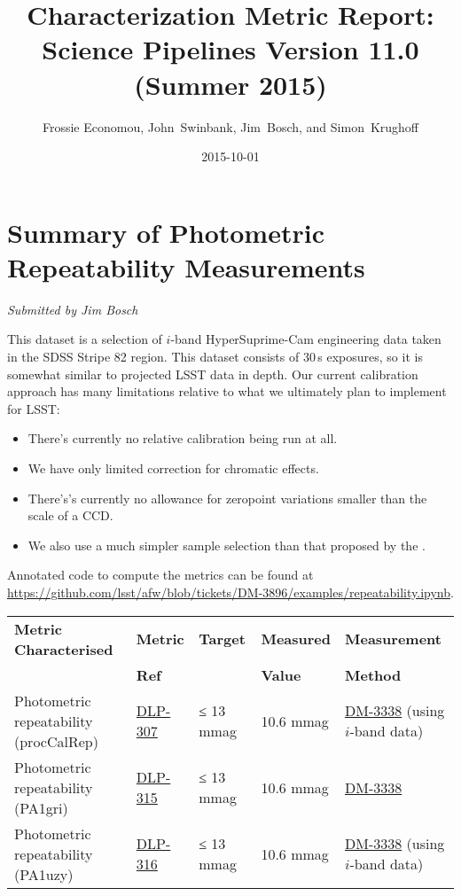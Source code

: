 \documentclass[DM,toc]{lsstdoc}
\title[Summer 2015 Characterization Report]{Characterization Metric Report: Science Pipelines Version 11.0 (Summer 2015)}
\author{Frossie Economou, John~Swinbank, Jim~Bosch, and Simon~Krughoff}
\date{2015-10-01}
\begin{document}
\maketitle

\section{Summary of Photometric Repeatability
Measurements}\label{summary-of-photometric-repeatability-measurements}

\emph{Submitted by Jim Bosch}

This dataset is a selection of $i$-band HyperSuprime-Cam engineering data
taken in the SDSS Stripe 82 region. This dataset consists of 30\,s
exposures, so it is somewhat similar to projected LSST data in depth.
Our current calibration approach has many limitations relative to what
we ultimately plan to implement for LSST:

\begin{itemize}
\item
  There's currently no relative calibration being run at all.
\item
  We have only limited correction for chromatic effects.
\item
  There's's currently no allowance for zeropoint variations smaller than
  the scale of a CCD.
\item
  We also use a much simpler sample selection than that proposed by the
  \SRD.
\end{itemize}

Annotated code to compute the metrics can be found at
\url{https://github.com/lsst/afw/blob/tickets/DM-3896/examples/repeatability.ipynb}.

\begin{small}
\begin{longtable}[]{@{}lllll@{}}
\toprule
\textbf{Metric Characterised} & \textbf{Metric} & \textbf{Target} &
\textbf{Measured} & \textbf{Measurement}\tabularnewline
 & \textbf{Ref} &  &
\textbf{Value} & \textbf{Method}\tabularnewline
\midrule
\endhead
Photometric repeatability (procCalRep) &
\href{https://jira.lsstcorp.org/browser/DLP-307}{DLP-307} & ≤ 13 mmag &
10.6 mmag & \href{https://jira.lsstcorp.org/browse/DM-3338}{DM-3338}
(using $i$-band data)\tabularnewline
Photometric repeatability (PA1gri) &
\href{https://jira.lsstcorp.org/browse/DLP-315}{DLP-315} & ≤ 13 mmag &
10.6 mmag &
\href{https://jira.lsstcorp.org/browse/DM-3338}{DM-3338}\tabularnewline
Photometric repeatability (PA1uzy) &
\href{https://jira.lsstcorp.org/browse/DLP-316}{DLP-316} & ≤ 13 mmag &
10.6 mmag & \href{https://jira.lsstcorp.org/browse/DM-3338}{DM-3338}
(using $i$-band data)\tabularnewline
\bottomrule
\end{longtable}
\end{small}
\end{document}
